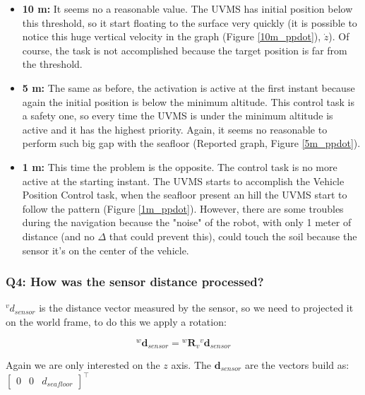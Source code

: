 \documentclass{article}
\begin{document}
\begin{itemize}
    \item \textbf{10 m:} It seems no a reasonable value. The UVMS has initial position below this threshold, so it start floating to the surface very quickly (it is possible to notice this huge vertical velocity in the graph (Figure \ref{10m_ppdot}), $\dot{z}$). Of course, the task is not accomplished because the target position is far from the threshold.
    \item \textbf{5 m:} The same as before, the activation is active at the first instant because again the initial position is below the minimum altitude. This control task is a safety one, so every time the UVMS is under the minimum altitude is active and it has the highest priority. Again, it seems no reasonable to perform such big gap with the seafloor (Reported graph, Figure \ref{5m_ppdot}).
    \item \textbf{1 m:} This time the problem is the opposite. The control task is no more active at the starting instant. The UVMS starts to accomplish the Vehicle Position Control task, when the seafloor present an hill the UVMS start to follow the pattern (Figure \ref{1m_ppdot}). However, there are some troubles during the navigation because the "noise" of the robot, with only 1 meter of distance (and no $\Delta$ that could prevent this), could touch the soil because the sensor it's on the center of the vehicle.
\end{itemize}

\subsubsection{Q4: How was the sensor distance processed?}
 
 ${^{v}d_{sensor}}$ is the distance vector measured by the sensor, so we need to projected it on the world frame, to do this we apply a rotation:
 
 \begin{equation}
     {^{w}\boldsymbol{d}_{sensor}} = {^{w}\boldsymbol{R}_{v}} {^{v}\boldsymbol{d}_{sensor}}
 \end{equation}
 
 Again we are only interested on the $z$ axis. The $\boldsymbol{d}_{sensor}$ are the vectors build as:
 $\begin{bmatrix}0 & 0 & d_{seafloor} \end{bmatrix}^\top$
\\
\end{document}
